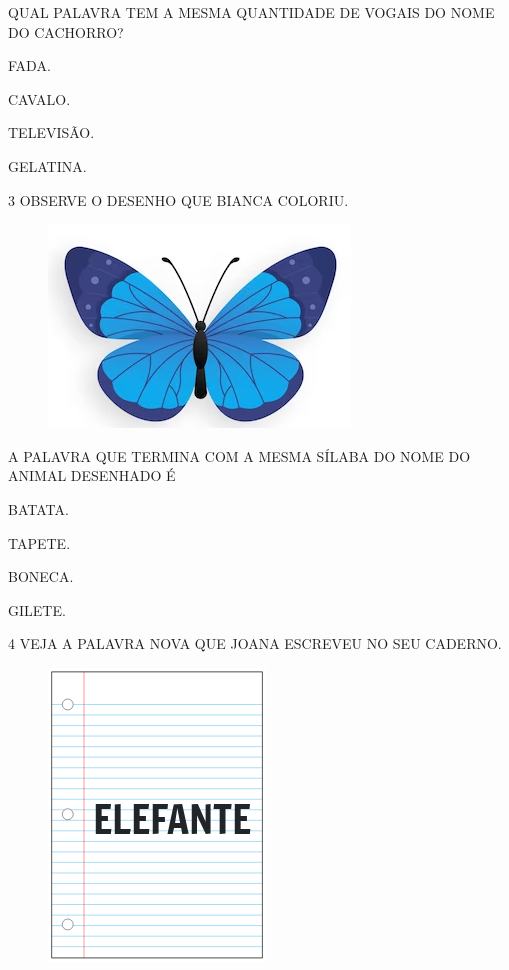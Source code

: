 QUAL PALAVRA TEM A MESMA QUANTIDADE DE VOGAIS DO NOME DO CACHORRO?

\begin{escolha}
\item FADA.

\item CAVALO.

\item TELEVISÃO.

\item GELATINA.
\end{escolha}

\num{3} OBSERVE O DESENHO QUE BIANCA COLORIU.

\begin{figure}[htpb]
\centering
\includegraphics[width=.5\textwidth]{media/image227.png}
\end{figure}


A PALAVRA QUE TERMINA COM A MESMA SÍLABA DO NOME DO ANIMAL DESENHADO É

\begin{escolha}
\item BATATA.

\item TAPETE.

\item BONECA.

\item GILETE.
\end{escolha}

\pagebreak
\num{4} VEJA A PALAVRA NOVA QUE JOANA ESCREVEU NO SEU CADERNO.

\begin{figure}[htpb]
\centering
\includegraphics[width=.25\textwidth]{media/image230.png}
\end{figure}

